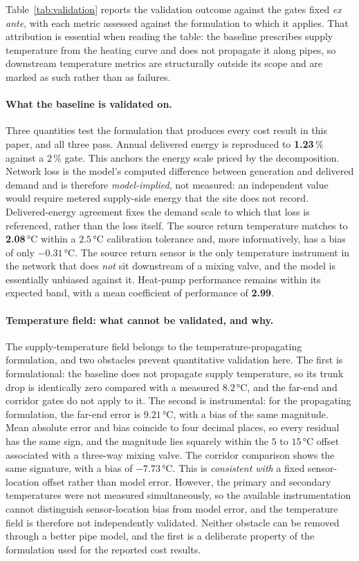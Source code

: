 
Table~\ref{tab:validation} reports the validation outcome against the gates fixed
\emph{ex ante}, with each metric assessed against the formulation to which it applies. That
attribution is essential when reading the table: the baseline prescribes supply temperature
from the heating curve and does not propagate it along pipes, so downstream temperature
metrics are structurally outside its scope and are marked as such rather than as failures.

\paragraph{What the baseline is validated on.}
Three quantities test the formulation that produces every cost result in this paper, and all
three pass. Annual delivered energy is reproduced to \textbf{1.23}\,\% against a \(2\,\%\)
gate. This anchors the energy scale priced by the decomposition. Network loss is the model's
computed difference between generation and delivered demand and is therefore
\emph{model-implied}, not measured: an independent value would require metered supply-side
energy that the site does not record. Delivered-energy agreement fixes the demand scale to
which that loss is referenced, rather than the loss itself.
The source return temperature matches to \textbf{2.08}\,°C within a \(2.5\)\,°C calibration
tolerance and,
more informatively, has a bias of only \(-0.31\)\,°C. The source return sensor is the only
temperature instrument in the network that does \emph{not} sit downstream of a mixing valve,
and the model is essentially unbiased against it. Heat-pump performance remains within its
expected band, with a mean coefficient of performance of \textbf{2.99}.

\paragraph{Temperature field: what cannot be validated, and why.}
The supply-temperature field belongs to the temperature-propagating formulation, and two
obstacles prevent quantitative validation here. The first is formulational: the baseline does
not propagate supply temperature, so its trunk drop is identically zero compared with a
measured \(8.2\)\,°C, and the far-end and corridor gates do not apply to it. The second is
instrumental: for the propagating formulation, the far-end error is \(9.21\)\,°C, with a bias
of the same magnitude. Mean absolute error and bias coincide to four decimal places, so every
residual has the same sign, and the magnitude lies squarely within the \(5\) to \(15\)\,°C
offset associated with a three-way mixing valve. The corridor comparison shows the same
signature, with a bias of \(-7.73\)\,°C. This is \emph{consistent with} a fixed sensor-location
offset rather than model error. However, the primary and secondary temperatures were not
measured simultaneously, so the available instrumentation cannot distinguish sensor-location
bias from model error, and the temperature field is therefore not independently validated.
Neither obstacle can be removed through a better pipe model, and the first is a deliberate
property of the formulation used for the reported cost results.

